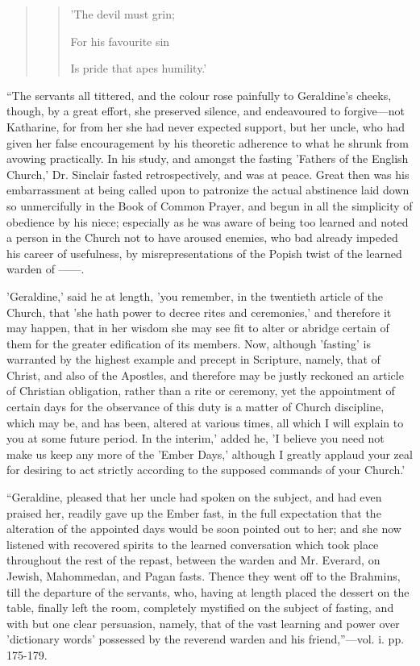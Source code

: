 \begin{quote}

\begin{quote}

'The devil must grin;

For his favourite sin

Is pride that apes humility.'

\end{quote}

\end{quote}

``The servants all tittered, and the
colour rose painfully to Geraldine's cheeks, though, by a great effort,
she preserved silence, and endeavoured to forgive—not Katharine, for
from her she had never expected support, but her uncle, who had given
her false encouragement by his theoretic adherence to what he shrunk
from avowing practically. In his study, and amongst the fasting 'Fathers
of the English Church,' Dr. Sinclair fasted retrospectively, and was at
peace. Great then was his embarrassment at
being called upon to patronize the actual abstinence laid down so
unmercifully in the Book of Common Prayer, and begun in all the
simplicity of obedience by his niece; especially as he was aware of
being too learned and noted a person in the Church not to have aroused
enemies, who bad already impeded his career of usefulness, by
misrepresentations of the Popish twist of the learned warden of ——.

'Geraldine,' said he at length, 'you
remember, in the twentieth article of the Church, that 'she hath power
to decree rites and ceremonies,' and therefore it may happen, that in
her wisdom she may see fit to alter or abridge certain of them for the
greater edification of its members. Now, although 'fasting' is warranted
by the highest example and precept in Scripture, namely, that of Christ,
and also of the Apostles, and therefore may be justly reckoned an
article of Christian obligation, rather than a rite or ceremony, yet the
appointment of certain days for the observance of this duty is a matter
of Church discipline, which may be, and has been, altered at various
times, all which I will explain to you at some future period. In the
interim,' added he, 'I believe you need not make us keep any more of the
'Ember Days,' although I greatly applaud your zeal for desiring to act
strictly according to the supposed commands of your Church.'

``Geraldine, pleased that her uncle
had spoken on the subject, and had even praised her, readily gave up the
Ember fast, in the full expectation that the alteration of the appointed
days would be soon pointed out to her; and she now listened with
recovered spirits to the learned conversation which took place
throughout the rest of the repast, between the warden and Mr. Everard,
on Jewish, Mahommedan, and Pagan fasts. Thence they went off to the
Brahmins, till the departure of the servants, who, having at length
placed the dessert on the table, finally left the room, completely
mystified on the subject of fasting, and with but one clear persuasion,
namely, that of the vast learning and power over 'dictionary words'
possessed by the reverend warden and his friend,''—vol. i. pp. 175-179.

